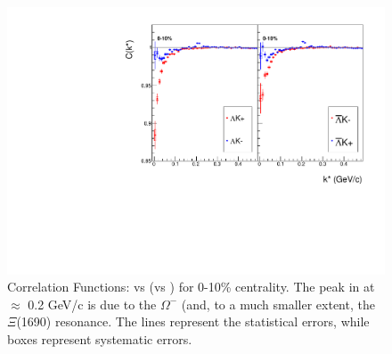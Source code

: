 \documentclass[../AnalysisNoteJBuxton.tex]{subfiles}
\begin{document}
\begin{figure}[h]
  \centering
  \includegraphics[width=\textwidth]{4_CorrelationFunctions/Figures/canLamKchPvsLamKchM0010.pdf}
  \caption[Correlation Functions: \LamKchP vs \LamKchM for 0-10\% Centrality]{Correlation Functions: \LamKchP vs \LamKchM (\ALamKchP vs \ALamKchM) for 0-10\% centrality.  The peak in \LamKchMALamKchP at \kstar $\approx$ 0.2 GeV/c is due to the $\Omega^{-}$ (and, to a much smaller extent, the $\Xi$(1690) resonance.  The lines represent the statistical errors, while boxes represent systematic errors.}
  \label{fig:cLamcKchCfs0010}
\end{figure}

\clearpage
\end{document}
